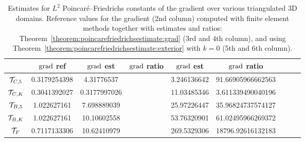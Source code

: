 \documentclass[10pt,a4paper]{article}
\begin{document}
\begin{table}[t]
    \color{red}
    \centering
    \begin{tabular}{|c|c|c|c|c|c|c|c|c|}
        \hline
                        & $\operatorname{grad}$ ref  & $\operatorname{grad}$ est  & $\operatorname{grad}$ ratio      & $\operatorname{grad}$ est & $\operatorname{grad}$ ratio       \\
        \hline
        ${\mathcal T}_{C,5}$   & 0.3179254398 & 4.31776537   &                    & 3.246136642  & 91.66905966662563  \\
        \hline
        ${\mathcal T}_{C,K}$   & 0.3041392027 & 0.3177997026 &                    & 11.03485346 & 3.611339490040196  \\
        \hline
        ${\mathcal T}_{B,5}$   & 1.022627161  & 7.698889039  &                    & 25.97226447  & 35.96824737574127  \\
        \hline
        ${\mathcal T}_{B,K}$   & 1.022627161  & 10.10602558  &                    & 53.76320901  & 61.02495966269372  \\
        \hline
        ${\mathcal T}_{F}$     & 0.7117133306 & 10.62410979 &                    & 269.5329306  & 18796.92616132183  \\ 
        \hline
    \end{tabular} 
    \caption{
    Estimates for $L^2$ Poincar\'e--Friedrichs constants of the gradient over various triangulated 3D domains.
    Reference values for the gradient (2nd column) computed with finite element methods together with estimates and ratios: 
    Theorem~\ref{theorem:poincarefriedrichsestimate:grad} (3rd and 4th column), and using Theorem~\ref{theorem:poincarefriedrichsestimate:exterior} with $k=0$ (5th and 6th column).
    }\label{table:estimates3D:grad}
\end{table}
  
\end{document}
